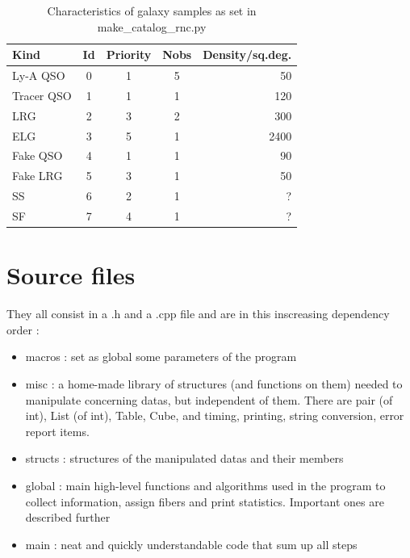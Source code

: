 \documentclass[10pt]{extarticle}
\begin{document}
\begin{multicols}{2}
\begin{table}[H]\begin{center}
	\caption{Characteristics of galaxy samples as set in make\_catalog\_rnc.py}\label{table:characteristics}
	\begin{tabular}{lcccr}\\ \hline
		Kind&Id&Priority&Nobs&Density/sq.deg.\\ \hline
		Ly-A QSO & 0 & 1 & 5 &  50\\
		Tracer QSO & 1 & 1 & 1& 120\\
		LRG & 2 & 3 &2 & 300\\
		ELG & 3 & 5 & 1 & 2400\\
		Fake QSO & 4 & 1 & 1& 90\\
		Fake LRG & 5 & 3 & 1 & 50\\
		SS & 6 & 2 & 1&  ?\\
		SF & 7 & 4 & 1& ?\\ \hline
	\end{tabular}\end{center}
\end{table}


\section{Source files}
They all consist in a .h and a .cpp file and are in this inscreasing dependency order :
\begin{itemize} 
	\item macros : set as global some parameters of the program
	\item misc : a home-made library of structures (and functions on them) needed to manipulate concerning datas, but independent of them. There are pair (of int), List (of int), Table, Cube, and timing, printing, string conversion, error report items.
	\item structs : structures of the manipulated datas and their members
	\item global : main high-level functions and algorithms used in the program to collect information, assign fibers and print statistics. Important ones are described further
	\item main : neat and quickly understandable code that sum up all steps
\end{itemize} 


\end{multicols}
\end{document}
